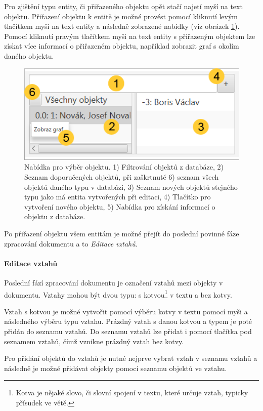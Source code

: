 \documentclass[12pt,a4paper]{report}
\begin{document}
Pro zjištění typu entity, či přiřazeného objektu opět stačí najetí myší na text objektu. Přiřazení objektu k entitě je možné provést pomocí kliknutí levým tlačítkem myši na text entity a následně zobrazené nabídky (viz obrázek \ref{fig:Objekty}). Pomocí kliknutí pravým tlačítkem myši na text entity s přiřazeným objektem lze získat více informací o přiřazeném objektu, například zobrazit graf s okolím daného objektu.

\begin{figure}[!htb]
	\centering
	\includegraphics[width=\textwidth]{objekty}
	\caption{Nabídka pro výběr objektu. 1) Filtrování objektů z databáze, 2) Seznam doporučených objektů, při zaškrtnuté 6) seznam všech objektů daného typu v databázi, 3) Seznam nových objektů stejného typu jako má entita vytvořených při editaci, 4) Tlačítko pro vytvoření nového objektu, 5) Nabídka pro získání informací o objektu z databáze.}
	\label{fig:Objekty}
\end{figure}

Po přiřazení objektu všem entitám je možné přejít do poslední povinné fáze zpracování dokumentu a to \emph{Editace vztahů}.

\paragraph{Editace vztahů}
Poslední fází zpracování dokumentu je označení vztahů mezi objekty v dokumentu. Vztahy mohou být dvou typu: s kotvou\footnote{Kotva je nějaké slovo, či slovní spojení v textu, které určuje vztah, typicky přísudek ve větě.} v textu a bez kotvy.

Vztah s kotvou je možné vytvořit pomocí výběru kotvy v textu pomocí myši a následného výběru typu vztahu. Prázdný vztah s danou kotvou a typem je poté přidán do seznamu vztahů. Do seznamu vztahů lze přidat i  pomocí tlačítka pod seznamem vztahů, čímž vznikne prázdný vztah bez kotvy.

Pro přidání objektů do vztahů je nutné nejprve vybrat vztah v seznamu vztahů a následně je možné přidávat objekty pomocí seznamu objektů ve vztahu.
\end{document}
